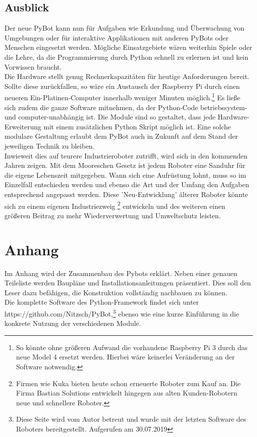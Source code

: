 \documentclass[twoside,11pt, a4paper]{report}
\begin{document}
	\section{Ausblick}
	Der neue PyBot kann nun für Aufgaben wie Erkundung und Überwachung von Umgebungen oder für interaktive Applikationen mit anderen PyBots oder Menschen eingesetzt werden. Mögliche Einsatzgebiete wären weiterhin Spiele oder die Lehre, da die Programmierung durch Python schnell zu erlernen ist und kein Vorwissen braucht. \\
	Die Hardware stellt genug Rechnerkapazitäten für heutige Anforderungen bereit. Sollte diese zurückfallen, so wäre ein Austausch der Raspberry Pi durch einen neueren Ein-Platinen-Computer innerhalb weniger Minuten möglich.\footnote{So könnte ohne größeren Aufwand die vorhandene Raspberry Pi 3 durch das neue Model 4 ersetzt werden. Hierbei wäre keinerlei Veränderung an der Software notwendig.} Es ließe sich zudem die ganze Software mitnehmen, da der Python-Code betriebssystem- und computer-unabhängig ist. Die Module sind so gestaltet, dass jede Hardware-Erweiterung mit einem zusätzlichen Python Skript möglich ist. Eine solche modulare Gestaltung erlaubt dem PyBot auch in Zukunft auf dem Stand der jeweiligen Technik zu bleiben. \\
	Inwieweit dies auf teurere Industrieroboter zutrifft, wird sich in den kommenden Jahren zeigen. Mit dem Mooreschen Gesetz ist jedem Roboter eine Sanduhr für die eigene Lebenszeit mitgegeben. Wann sich eine Aufrüstung lohnt, muss so im Einzelfall entschieden werden und ebenso die Art und der Umfang den Aufgaben entsprechend angepasst werden. Diese 'Neu-Entwicklung' älterer Roboter könnte sich zu einem eigenen Industriezweig \footnote{Firmen wie Kuka bieten heute schon erneuerte Roboter zum Kauf an. Die Firma Bastian Solutions entwickelt hingegen aus alten Kunden-Robotern neue und schnellere Roboter. } entwickeln und des weiteren einen größeren Beitrag zu mehr Wiederverwertung und Umweltschutz leisten. 
	  
	
	
	
	\let\cleardoublepage\clearpage
	\appendix
	\let\cleardoublepage\clearpage
	\chapter{Anhang}
	Im Anhang wird der Zusammenbau des Pybots erklärt. Neben einer genauen Teileliste werden Baupläne und Installationsanleitungen präsentiert. Dies soll den Leser dazu befähigen, die Konstruktion vollständig nachbauen zu können. \\
	Die komplette Software des Python-Framework findet sich unter https://github.com/Nitzsch/PyBot,\footnote{Diese Seite wird vom Autor betreut und wurde mit der letzten Software des Roboters bereitgestellt. Aufgerufen am 30.07.2019} ebenso wie eine kurze Einführung in die konkrete Nutzung der verschiedenen Module. 
	\let\cleardoublepage\clearpage
\end{document}
